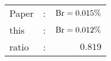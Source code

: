       \begin{tabular}{lcr}
          Paper &:& $\mathrm{Br}  = 0.015\%$ \\
          this      &:& $\mathrm{Br}  = 0.012\%$ \\
		  ratio   &:& $0.819$ \\
      \end{tabular}
